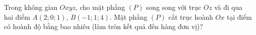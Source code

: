 \begin{ex}
Trong không gian $Oxyz$, cho mặt phẳng $(P)$ song song với trục $Oz$ và đi qua hai điểm $A(2;0;1)$, $B(-1;1;4)$. Mặt phẳng $(P)$ cắt trục hoành $Ox$ tại điểm có hoành độ bằng bao nhiêu (làm tròn kết quả đến hàng đơn vị)?
\end{ex}
